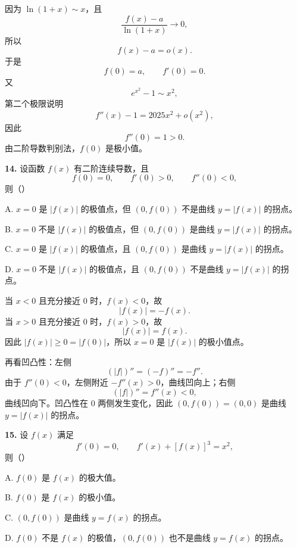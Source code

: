 \begin{solutionblock}
因为 \(\ln(1+x)\sim x\)，且
\[
\frac{f(x)-a}{\ln(1+x)}\to0,
\]
所以
\[
f(x)-a=o(x).
\]
于是
\[
f(0)=a,\qquad f'(0)=0.
\]
又
\[
e^{x^2}-1\sim x^2,
\]
第二个极限说明
\[
f''(x)-1=2025x^2+o(x^2),
\]
因此
\[
f''(0)=1>0.
\]
由二阶导数判别法，\(f(0)\) 是极小值。

\end{solutionblock}

\begin{problemblock}
\textbf{14.} 设函数 \(f(x)\) 有二阶连续导数，且
\[
f(0)=0,\qquad f'(0)>0,\qquad f''(0)<0,
\]
则（\quad）

A. \(x=0\) 是 \(|f(x)|\) 的极值点，但 \((0,f(0))\) 不是曲线 \(y=|f(x)|\) 的拐点。

B. \(x=0\) 不是 \(|f(x)|\) 的极值点，但 \((0,f(0))\) 是曲线 \(y=|f(x)|\) 的拐点。

C. \(x=0\) 是 \(|f(x)|\) 的极值点，且 \((0,f(0))\) 是曲线 \(y=|f(x)|\) 的拐点。

D. \(x=0\) 不是 \(|f(x)|\) 的极值点，且 \((0,f(0))\) 不是曲线 \(y=|f(x)|\) 的拐点。
\end{problemblock}

\begin{solutionblock}
当 \(x<0\) 且充分接近 0 时，\(f(x)<0\)，故
\[
|f(x)|=-f(x).
\]
当 \(x>0\) 且充分接近 0 时，\(f(x)>0\)，故
\[
|f(x)|=f(x).
\]
因此 \(|f(x)|\ge0=|f(0)|\)，所以 \(x=0\) 是 \(|f(x)|\) 的极小值点。

再看凹凸性：左侧
\[
(|f|)''=(-f)''=-f''.
\]
由于 \(f''(0)<0\)，左侧附近 \(-f''(x)>0\)，曲线凹向上；右侧
\[
(|f|)''=f''(x)<0,
\]
曲线凹向下。凹凸性在 0 两侧发生变化，因此 \((0,f(0))=(0,0)\) 是曲线 \(y=|f(x)|\) 的拐点。

\end{solutionblock}

\begin{problemblock}
\textbf{15.} 设 \(f(x)\) 满足
\[
f'(0)=0,\qquad f'(x)+[f(x)]^3=x^2,
\]
则（\quad）

A. \(f(0)\) 是 \(f(x)\) 的极大值。

B. \(f(0)\) 是 \(f(x)\) 的极小值。

C. \((0,f(0))\) 是曲线 \(y=f(x)\) 的拐点。

D. \(f(0)\) 不是 \(f(x)\) 的极值，\((0,f(0))\) 也不是曲线 \(y=f(x)\) 的拐点。
\end{problemblock}

